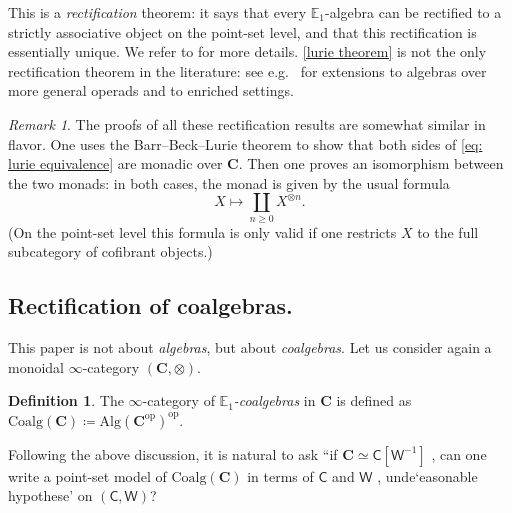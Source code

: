 \documentclass[a4paper,12pt]{amsart}
\theoremstyle{plain}
\theoremstyle{definition}
\newtheorem{definition}[theorem]{Definition}%
\theoremstyle{remark}
\newtheorem{remark}[theorem]{\sc Remark}%
\begin{document}
This is a \emph{rectification} theorem: it says that every $\mathbb E_1$-algebra can be rectified to a strictly associative object on the point-set level, and that this rectification is essentially unique. We refer to \cite[Section 4.1.8]{HigherAlgebra} for more details. \cref{lurie theorem} is not the only rectification theorem in the literature: see e.g.\ \cite{haugseng-rectification,HinichRectification,PavlovScholbach18} for extensions to algebras over more general operads and to enriched settings. 

\begin{remark}\label{strategy remark}
    The proofs of all these rectification results are somewhat similar in flavor. One uses the Barr--Beck--Lurie theorem to show that both sides of \eqref{eq: lurie equivalence} are monadic over $\mathbf C$. Then one proves an isomorphism between the two monads: in both cases, the monad is given by the usual formula
\begin{equation}\label{classical free algebra} X \mapsto \coprod_{n \geq 0} X^{\otimes n}.\end{equation}
(On the point-set level this formula is only valid if one restricts $X$ to the full subcategory of cofibrant objects.)
\end{remark}

\subsection{Rectification of coalgebras.} This paper is not about \emph{algebras}, but about \emph{coalgebras}. 
Let us consider again a monoidal $\infty$-category $(\mathbf C,\otimes)$. 

\begin{definition}\label{def:coalgebra}The $\infty$-category of \emph{$\mathbb E_1$-coalgebras} in $\mathbf{C}$ is defined as $\mathrm{Coalg}(\mathbf C) \coloneqq \mathrm{Alg}(\mathbf C^{\mathrm{op}})^{\mathrm{op}}$.
\end{definition} 

Following the above discussion, it is natural %
to ask ``if $\mathbf C \simeq \mathsf C[\mathsf W^{-1}]$%
, can one write a point-set model of $\mathrm{Coalg}(\mathbf C)$ in terms of $\mathsf C$ and $\mathsf W$%
, unde`easonable hypothese' on $(\mathsf C,\mathsf W)$? 
\end{document}
